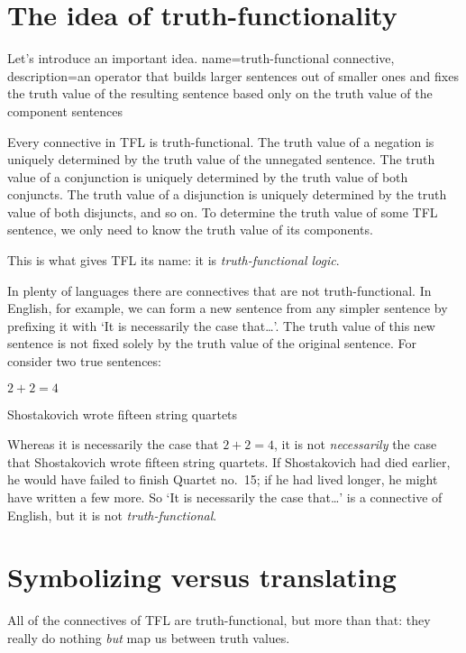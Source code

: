 \section{The idea of truth-functionality}
Let's introduce an important idea. 
{
name=truth-functional connective,
description={an operator that builds larger sentences out of smaller ones and fixes the \gls{truth value} of the resulting sentence based only on the truth value of the component sentences}
}
        
Every connective in TFL is truth-functional. The truth value of a negation is uniquely determined by the truth value of the unnegated sentence. The truth value of a conjunction is uniquely determined by the truth value of both conjuncts. The truth value of a disjunction is uniquely determined by the truth value of both disjuncts, and so on. To determine the truth value of some TFL sentence, we only need to know the truth value of its components. 

This is what gives TFL its name: it is \emph{truth-functional logic}.

In plenty of languages there are connectives that are not truth-functional. In English, for example, we can form a new sentence from any simpler sentence by prefixing it with `It is necessarily the case that\ldots'. The truth value of this new sentence is not fixed solely by the truth value of the original sentence. For consider two true sentences:
	\begin{earg}
		\item $2 + 2 = 4$
		\item Shostakovich wrote fifteen string quartets
	\end{earg}
Whereas it is necessarily the case that $2 + 2 = 4$, it is not \emph{necessarily} the case that Shostakovich wrote fifteen string quartets. If Shostakovich had died earlier, he would have failed to finish Quartet no.\ 15; if he had lived longer, he might have written a few more. So `It is necessarily the case that\ldots' is a connective of English, but it is not \emph{truth-functional}.


\section{Symbolizing versus translating}
All of the connectives of TFL are truth-functional, but more than that: they really do nothing \emph{but} map us between truth values.  

